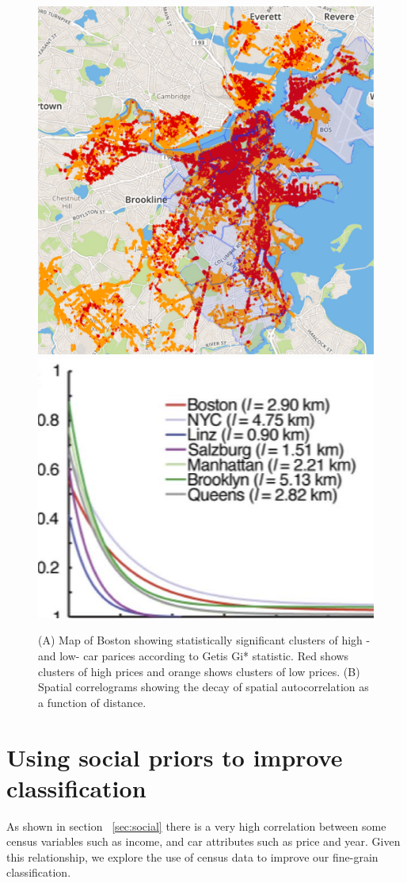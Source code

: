\documentclass[10pt,twocolumn,letterpaper]{article}
\begin{document}
\begin{figure}[t]
\begin{center}
    \includegraphics[width=0.45\linewidth]{img/boston-hotspot.png}
    \includegraphics[width=0.45\linewidth]{img/autocorr.png}
\end{center}
   \caption {(A)  Map of Boston showing statistically significant clusters of high -and low- car parices according to Getis Gi* statistic. Red shows clusters of high prices and orange shows clusters of low prices. (B) Spatial correlograms showing the decay of spatial autocorrelation as a function of distance.}
\label{fig:boston-hotspot}
\end{figure}

\section{Using social priors to improve classification}
As shown in section ~\ref{sec:social} there is a very high correlation between some census variables such as income, and car attributes such as price and year. Given this relationship, we explore the use of census data to improve our fine-grain classification.
\end{document}

